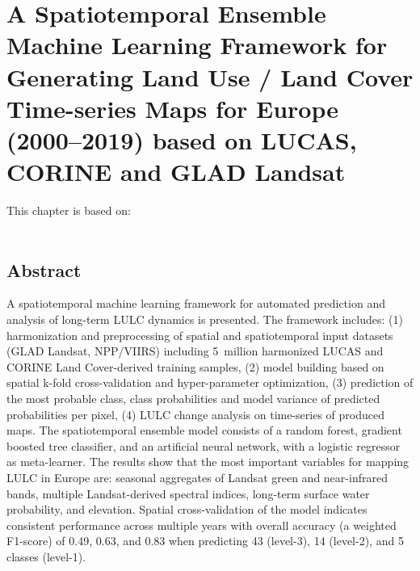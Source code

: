 \chapter[Spatiotemporal Machine Learning]{A Spatiotemporal Ensemble Machine Learning Framework for Generating Land Use / Land Cover Time-series Maps for Europe (2000--2019) based on LUCAS, CORINE and GLAD Landsat}
\label{cha:chapter2}
\vspace*{\fill}
This chapter is based on:
\\
\\
\newpage

\section*{Abstract}
A spatiotemporal machine learning framework for automated prediction and analysis of long-term LULC dynamics is presented. The framework includes: (1) harmonization and preprocessing of 
spatial and spatiotemporal input datasets (GLAD Landsat, NPP/VIIRS) including 5~million harmonized LUCAS and CORINE Land Cover-derived training samples, (2) model building based on spatial k-fold cross-validation and hyper-parameter optimization, (3) prediction of the most probable class, class probabilities and model variance of predicted probabilities per pixel, (4) LULC change analysis on time-series of produced maps. The spatiotemporal ensemble model consists of a random forest, gradient boosted tree classifier, and an artificial neural network, with a logistic regressor as meta-learner. The results show that the most important variables for mapping LULC in Europe are: seasonal aggregates of Landsat green and near-infrared bands, multiple Landsat-derived spectral indices, long-term surface water probability, and elevation. Spatial cross-validation of the model indicates consistent performance across multiple years with overall accuracy (a weighted F1-score) of 0.49, 0.63, and 0.83 when predicting 43 (level-3), 14 (level-2), and 5 classes (level-1). 
